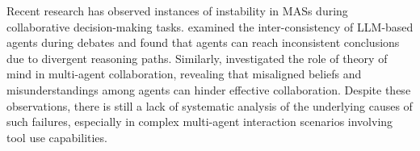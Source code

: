 Recent research has observed instances of instability in MASs during collaborative decision-making tasks. 
\citet{debate_interconsistency} examined the inter-consistency of LLM-based agents during debates and found that agents can reach inconsistent conclusions due to divergent reasoning paths. 
Similarly, \citet{theory_of_mind_multiagent} investigated the role of theory of mind in multi-agent collaboration, revealing that misaligned beliefs and misunderstandings among agents can hinder effective collaboration. 
Despite these observations, there is still a lack of systematic analysis of the underlying causes of such failures, especially in complex multi-agent interaction scenarios involving tool use capabilities.
